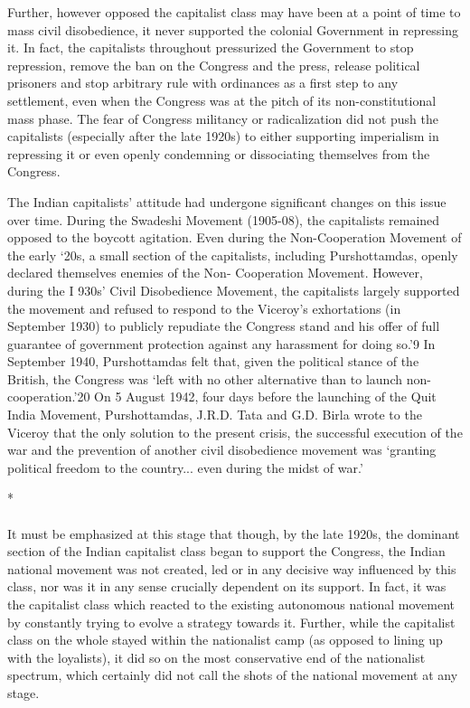 Further, however opposed the capitalist class may have been at a point of time to mass civil disobedience, it never supported the colonial Government in repressing it. In fact, the capitalists throughout pressurized the Government to stop repression, remove the ban on the Congress and the press, release political prisoners and stop arbitrary rule with ordinances as a first step to any settlement, even when the Congress was at the pitch of its non-constitutional mass phase. The fear of Congress militancy or radicalization did not push the capitalists (especially after the late 1920s) to either supporting imperialism in repressing it or even openly condemning or dissociating themselves from the Congress. 

The Indian capitalists' attitude had undergone significant changes on this issue over time. During the Swadeshi Movement (1905-08), the capitalists remained opposed to the boycott agitation. Even during the Non-Cooperation Movement of the early `20s, a small section of the capitalists, including Purshottamdas, openly declared themselves enemies of the Non- Cooperation Movement. However, during the I 930s' Civil Disobedience Movement, the capitalists largely supported the movement and refused to respond to the Viceroy's exhortations (in September 1930) to publicly repudiate the Congress stand and his offer of full guarantee of government protection against any harassment for doing so.'9 In September 1940, Purshottamdas felt that, given the political stance of the British, the Congress was `left with no other alternative than to launch non-cooperation.'20 On 5 August 1942, four days before the launching of the Quit India Movement, Purshottamdas, J.R.D. Tata and G.D. Birla wrote to the Viceroy that the only solution to the present crisis, the successful execution of the war and the prevention of another civil disobedience movement was `granting political freedom to the country... even during the midst of war.'

\begin{center}*\end{center}

\paragraph*{}


It must be emphasized at this stage that though, by the late 1920s, the dominant section of the Indian capitalist class began to support the Congress, the Indian national movement was not created, led or in any decisive way influenced by this class, nor was it in any sense crucially dependent on its support. In fact, it was the capitalist class which reacted to the existing autonomous national movement by constantly trying to evolve a strategy towards it. Further, while the capitalist class on the whole stayed within the nationalist camp (as opposed to lining up with the loyalists), it did so on the most conservative end of the nationalist spectrum, which certainly did not call the shots of the national movement at any stage. 

